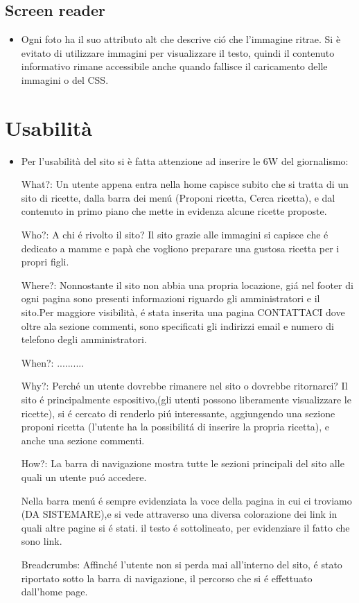 \documentclass[12pt]{article}
\begin{document}
			\subsection{Screen reader}
			\begin{itemize}
				\item Ogni foto ha il suo attributo alt che descrive ci\'o che l'immagine ritrae.
				Si è evitato di utilizzare immagini per visualizzare il testo, quindi il contenuto informativo rimane accessibile anche quando fallisce il caricamento delle immagini o del CSS.
			\end{itemize}
			\section{Usabilit\`a}
			\begin{itemize}
				\item Per l'usabilit\`a del sito si è fatta attenzione ad inserire le 6W del giornalismo:
				
				What?: Un utente appena entra nella home capisce subito che si tratta di un sito di ricette, dalla barra dei men\'u (Proponi ricetta, Cerca ricetta), e dal contenuto in primo piano che mette in evidenza alcune ricette proposte.
				
				Who?: A chi \'e rivolto il sito? Il sito grazie alle immagini si capisce che \'e dedicato a mamme e pap\`a
				che vogliono preparare una gustosa ricetta per i propri figli.
				
				Where?: Nonnostante il sito non abbia una propria locazione, gi\'a  nel footer di ogni pagina sono presenti informazioni riguardo gli amministratori e il sito.Per maggiore visibilit\`a, \'e stata inserita una pagina CONTATTACI dove oltre ala sezione commenti, sono specificati gli indirizzi email e numero di telefono degli amministratori. 
				
				When?: ..........
				
				Why?: Perch\'e un utente dovrebbe rimanere nel sito o dovrebbe ritornarci? Il sito \'e principalmente espositivo,(gli utenti possono liberamente visualizzare le ricette), si \'e cercato di renderlo pi\'u interessante, aggiungendo una sezione proponi ricetta (l'utente ha la possibilit\'a di inserire la propria ricetta), e anche una sezione commenti.
				
				How?: La barra di navigazione mostra tutte le sezioni principali del sito alle quali un utente pu\'o accedere.
				
				Nella barra men\'u \'e sempre evidenziata la voce della pagina in cui ci troviamo (DA SISTEMARE),e si vede attraverso una diversa colorazione dei link in quali altre pagine si \'e stati. il testo \'e sottolineato, per evidenziare il fatto che sono link.
				
				Breadcrumbs: Affinch\'e l'utente non si perda mai all'interno del sito, \'e stato riportato sotto la barra di navigazione, il percorso che si \'e effettuato dall'home page.
				
			\end{itemize}
\end{document}

